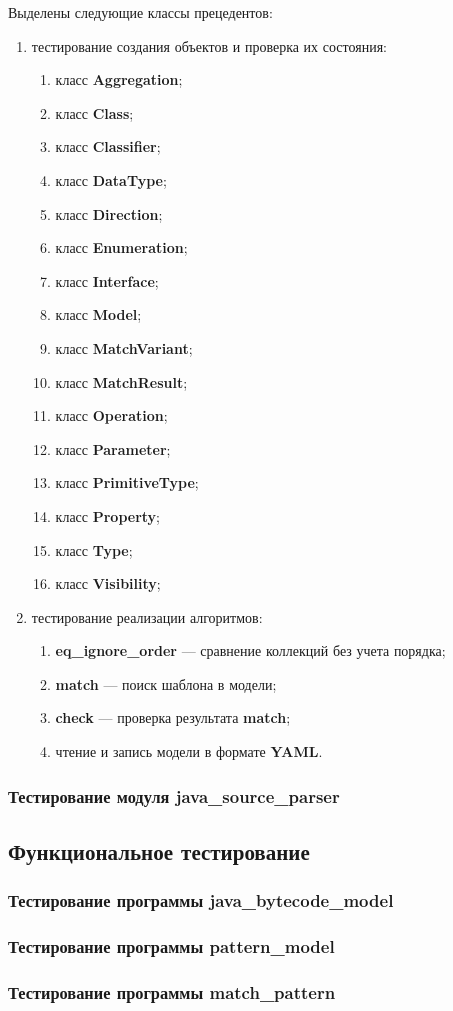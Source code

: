 Выделены следующие классы прецедентов:
\begin{enumerate}
    \item тестирование создания объектов и проверка их состояния:
    \begin{enumerate}
        \item класс \textbf{Aggregation};
        \item класс \textbf{Class};
        \item класс \textbf{Classifier};
        \item класс \textbf{DataType};
        \item класс \textbf{Direction};
        \item класс \textbf{Enumeration};
        \item класс \textbf{Interface};
        \item класс \textbf{Model};
        \item класс \textbf{MatchVariant};
        \item класс \textbf{MatchResult};
        \item класс \textbf{Operation};
        \item класс \textbf{Parameter};
        \item класс \textbf{PrimitiveType};
        \item класс \textbf{Property};
        \item класс \textbf{Type};
        \item класс \textbf{Visibility};
    \end{enumerate}
    \item тестирование реализации алгоритмов:
    \begin{enumerate}
        \item \textbf{eq\_ignore\_order} --- сравнение коллекций без учета порядка;
        \item \textbf{match} --- поиск шаблона в модели;
        \item \textbf{check} --- проверка результата \textbf{match};
        \item чтение и запись модели в формате \textbf{YAML}.
    \end{enumerate}
\end{enumerate}

\subsubsection{Тестирование модуля java\_source\_parser}

\subsection{Функциональное тестирование}

\subsubsection{Тестирование программы java\_bytecode\_model}

\subsubsection{Тестирование программы pattern\_model}

\subsubsection{Тестирование программы match\_pattern}
